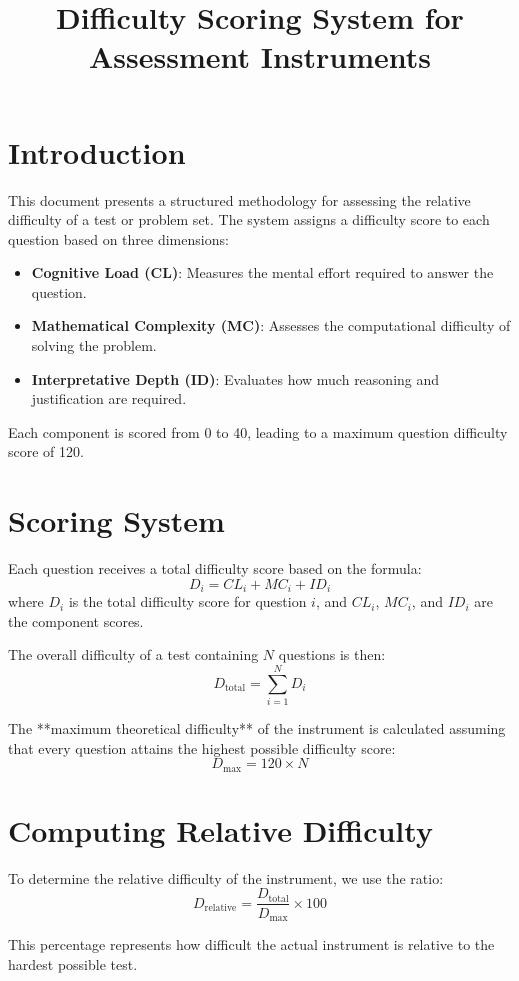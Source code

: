 \documentclass{article}
\title{Difficulty Scoring System for Assessment Instruments}
\author{}
\date{}
\begin{document}
\maketitle

\section{Introduction}
This document presents a structured methodology for assessing the relative difficulty of a test or problem set. The system assigns a difficulty score to each question based on three dimensions:

\begin{itemize}
    \item \textbf{Cognitive Load (CL)}: Measures the mental effort required to answer the question.
    \item \textbf{Mathematical Complexity (MC)}: Assesses the computational difficulty of solving the problem.
    \item \textbf{Interpretative Depth (ID)}: Evaluates how much reasoning and justification are required.
\end{itemize}

Each component is scored from 0 to 40, leading to a maximum question difficulty score of 120.

\section{Scoring System}
Each question receives a total difficulty score based on the formula:
\[
D_i = CL_i + MC_i + ID_i
\]
where \(D_i\) is the total difficulty score for question \(i\), and \(CL_i\), \(MC_i\), and \(ID_i\) are the component scores.

The overall difficulty of a test containing \( N \) questions is then:
\[
D_{\text{total}} = \sum_{i=1}^{N} D_i
\]

The **maximum theoretical difficulty** of the instrument is calculated assuming that every question attains the highest possible difficulty score:
\[
D_{\text{max}} = 120 \times N
\]

\section{Computing Relative Difficulty}
To determine the relative difficulty of the instrument, we use the ratio:
\[
D_{\text{relative}} = \frac{D_{\text{total}}}{D_{\text{max}}} \times 100
\]

This percentage represents how difficult the actual instrument is relative to the hardest possible test.
\end{document}
